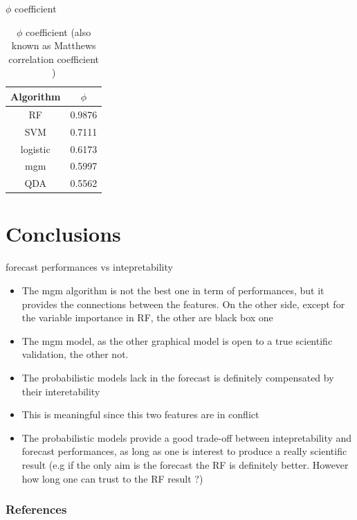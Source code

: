\documentclass{beamer}
\begin{document}
\begin{frame}{$\phi$ coefficient}
\begin{table}[]
\caption{$\phi$ coefficient (also known as Matthews correlation coefficient )}
\begin{center}
\begin{tabular}{c|c}
Algorithm & $\phi$ \\ \hline
RF        & 0.9876 \\ \hline
SVM       & 0.7111 \\ \hline
logistic  & 0.6173 \\ \hline
mgm       & 0.5997 \\ \hline
QDA       & 0.5562 
\end{tabular}
\end{center}
\label{phi_values}
\end{table}
\end{frame}

\section{Conclusions}

\begin{frame}{forecast performances vs intepretability}
\begin{itemize}
\item The mgm algorithm is not the best one in term of performances, but it provides the connections between the features. On the other side, except for the variable importance in RF, the other are black box one
\item The mgm model, as the other graphical model is open to a true scientific validation, the other not. 
\item The probabilistic models lack in the forecast is definitely compensated by their interetability 
\item This is meaningful since this two features are in conflict 
\item The probabilistic models provide a good trade-off between intepretability and forecast performances, as long as one is interest to produce a really scientific result (e.g if the only aim is the forecast the RF is definitely better. However how long one can trust to the RF result ?)
\end{itemize}
\end{frame}


\begin{frame}[t,allowframebreaks]
\frametitle{References}
\printbibliography
\end{frame}
\end{document}
